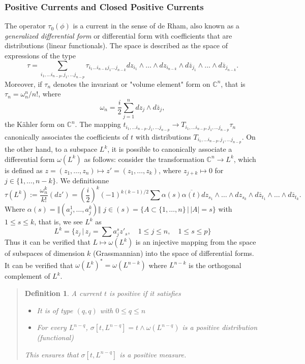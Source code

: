 \documentclass[12pt,twoside,a4paper]{report}
\newtheorem{definition}{Definition}[section]
\begin{document}
\subsubsection{Positive Currents and Closed Positive Currents}
The operator $\tau_0(\phi)$ is a current in the sense of de Rham, also known as a \emph{generalized differential form} or differential form with coefficients that are distributions (linear functionals). The space is described as the space of expressions of the type
\[
    \tau=\sum_{i_1,\dots i_{n-p},j_1,\dots j_{n-p}}\tau_{i_1\dots i_{n-k}j_1\dots j_{n-k}} dz_{i_1}\wedge\dots\wedge dz_{i_{n-k}}\wedge d\overline{z}_{j_1}\wedge\dots\wedge d\overline{z}_{j_{n-k}}.
\]
Moreover, if $\tau_n$ denotes the invariant or "volume element" form on $\mathbb{C}^n$, that is $\tau_n=\omega_n^n/n!$, where
\[
    \omega_n=\frac{i}{2}\sum_{j=1}^n dz_j\wedge d\overline{z}_j,
\]
the Kähler form on $\mathbb{C}^n$. The mapping $t_{i_1,\dots i_{n-p},j_1,\dots j_{n-p}}\rightarrow T_{i_1,\dots i_{n-p},j_1,\dots j_{n-p}}\tau_n$ canonically associates the coefficients of $t$ with distributions $T_{i_1,\dots i_{n-p},j_1,\dots j_{n-p}}$. On the other hand, to a subspace $L^k$,
\noindent it is possible to canonically associate a differential form $\omega(L^k)$ as follows: consider the transformation $\mathbb{C}^n\rightarrow L^k$, which is defined as $z=(z_1,\dots,z_n)\mapsto z'=(z_1,\dots,z_k)$, where $z_{j+k}\mapsto 0$ for $j\in\{1,\dots,n-k\}$. We definitionne
\[
    \tau(L^k):=\frac{\omega_n^k}{k!}(dz')=(\frac{i}{2})^k(-1)^{k(k-1)/2}\sum \alpha(s)\overline{\alpha(t)}dz_{s_1}\wedge\dots\wedge dz_{s_k}\wedge d\overline{z}_{t_1}\wedge \dots\wedge d\overline{z}_{t_k}.
\]
Where $\alpha(s)=\Vert(a^{1}_{j},\dots,a^{k}_{j})\Vert$ $j\in(s)=\{A\subset\{1,\dots,n\}\,\vert\, |A|=s\}$ with $1\leq s\leq k$, that is, we see $L^k$ as
\[
    L^k=\{z_j\,\vert\,z_j=\sum a^{s}_{j}z'_s,\quad 1\leq j\leq n,\quad 1\leq s\leq p \}
\]
Thus it can be verified that $L\mapsto\omega(L^k)$ is an injective mapping from the space of subspaces of dimension $k$ (Grassmannian) into the space of differential forms. It can be verified that $\omega(L^k)^{*}=\omega(L^{n-k})$ where $L^{n-k}$ is the orthogonal complement of $L^k$.
\begin{quote}
\begin{definition}
    A current $t$ is positive if it satisfies
    \begin{itemize}
        \item[a)] It is of type $(q,q)$ with $0\leq q\leq n$
        \item[b)] For every $L^{n-q}$, $\sigma[t,L^{n-q}]=t\wedge\omega(L^{n-q})$ is a positive distribution (functional)
    \end{itemize}
    This ensures that $\sigma[t,L^{n-q}]$ is a positive measure.
\end{definition}
\end{quote}
\end{document}
